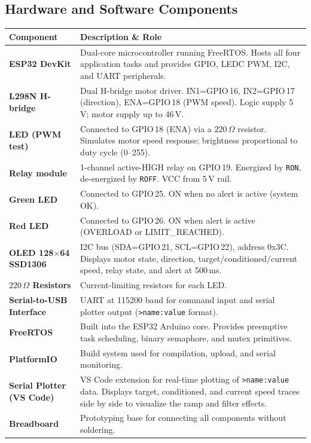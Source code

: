\subsection{Hardware and Software Components}

\begin{center}
\begin{tabular}{| p{4cm} | p{10cm} |}
\hline
\textbf{Component} & \textbf{Description \& Role} \\ \hline
\textbf{ESP32 DevKit} & Dual-core microcontroller running FreeRTOS. Hosts all four
  application tasks and provides GPIO, LEDC PWM, I2C, and UART peripherals. \\ \hline
\textbf{L298N H-bridge} & Dual H-bridge motor driver. IN1=GPIO\,16, IN2=GPIO\,17
  (direction), ENA=GPIO\,18 (PWM speed). Logic supply 5\,V; motor supply up to
  46\,V. \\ \hline
\textbf{LED (PWM test)} & Connected to GPIO\,18 (ENA) via a $220\,\Omega$ resistor.
  Simulates motor speed response; brightness proportional to duty cycle
  (0--255). \\ \hline
\textbf{Relay module} & 1-channel active-HIGH relay on GPIO\,19. Energized by
  \texttt{RON}, de-energized by \texttt{ROFF}. VCC from 5\,V rail. \\ \hline
\textbf{Green LED} & Connected to GPIO\,25. ON when no alert is active
  (system OK). \\ \hline
\textbf{Red LED} & Connected to GPIO\,26. ON when alert is active (OVERLOAD or
  LIMIT\_REACHED). \\ \hline
\textbf{OLED 128$\times$64 SSD1306} & I2C bus (SDA=GPIO\,21, SCL=GPIO\,22),
  address 0x3C. Displays motor state, direction, target/conditioned/current speed,
  relay state, and alert at 500\,ms. \\ \hline
\textbf{$220\,\Omega$ Resistors} & Current-limiting resistors for each LED. \\ \hline
\textbf{Serial-to-USB Interface} & UART at 115200 baud for command input and
  serial plotter output (\texttt{>name:value} format). \\ \hline
\textbf{FreeRTOS} & Built into the ESP32 Arduino core. Provides preemptive task
  scheduling, binary semaphore, and mutex primitives. \\ \hline
\textbf{PlatformIO} & Build system used for compilation, upload, and serial
  monitoring. \\ \hline
\textbf{Serial Plotter (VS Code)} & VS Code extension for real-time plotting of
  \texttt{>name:value} data. Displays target, conditioned, and current speed
  traces side by side to visualize the ramp and filter effects. \\ \hline
\textbf{Breadboard} & Prototyping base for connecting all components without
  soldering. \\ \hline
\end{tabular}
\end{center}

